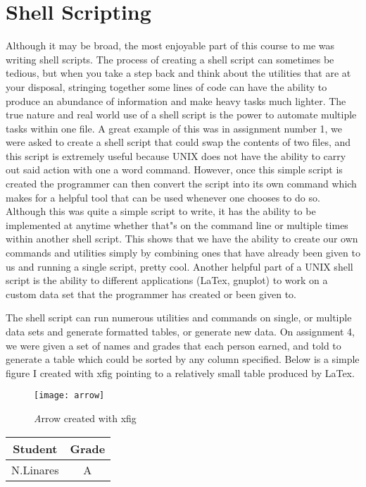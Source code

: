 \documentclass{article}
\begin{document}
\section{Shell Scripting}	
		Although it may be broad, the most enjoyable part of this course to me was writing shell scripts. 
The process of creating a shell script can sometimes be tedious, but when you take a step back and think 
about the utilities that are at your disposal, stringing together some lines of code can have the ability to 
produce an abundance of information and make heavy tasks much lighter. The true nature and real 
world use of a shell script is the power to automate multiple tasks within one file. A great example of 
this was in assignment number 1, we were asked to create a shell script that could swap the contents of 
two files, and this script is extremely useful because UNIX does not have the ability to carry out said 
action with one a word command. However, once this simple script is created the programmer can then 
convert the script into its own command which makes for a helpful tool that can be used whenever one 
chooses to do so. Although this was quite a simple script to write, it has the ability to be implemented at 
anytime whether that"s on the command line or multiple times within another shell script. This shows 
that we have the ability to create our own commands and utilities simply by combining ones that have 
already been given to us and running a single script, pretty cool. Another helpful part of a UNIX shell 
script is the ability to different applications (LaTex, gnuplot) to work on a custom data set that the 
programmer has created or been given to.\par 
The shell script can run numerous utilities and commands on 
single, or multiple data sets and generate formatted tables, or generate new data. On assignment 4, we 
were given a set of names and grades that each person earned, and told to generate a table which could 
be sorted by any column specified. Below is a simple figure I created with xfig pointing to a relatively small table produced by LaTex.\par


\begin{figure}[!h]
\centering
\texttt{[image: arrow]}
\caption{\textit Arrow created with xfig}
\end{figure}
	
\begin{center}
  \begin{table}[!h] 
    \begin{tabular}{|c|c|}
      \hline
      Student & Grade \\ \hline
      N.Linares & A \\
      \hline
    \end{tabular}
  \end{table}
\end{center}  
\end{document}

